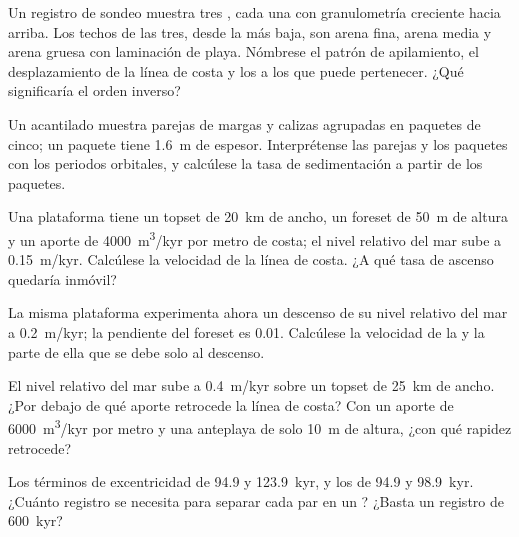 \begin{exercise}[$\star$]\label{exo:b3:sequence-stratigraphy:3}
Un registro de sondeo muestra tres , cada una con granulometría creciente hacia arriba. Los techos de las
tres, desde la más baja, son arena fina, arena media y arena gruesa con
laminación de playa. Nómbrese el patrón de apilamiento, el desplazamiento de la línea de costa y los
 a los que puede pertenecer. ¿Qué significaría el orden inverso?
\end{exercise}

\begin{exercise}[$\star$]\label{exo:b3:sequence-stratigraphy:4}
Un acantilado muestra parejas de margas y calizas agrupadas en paquetes de cinco; un
paquete tiene \qty{1.6}{m} de espesor. Interprétense las parejas y los paquetes con los
periodos orbitales, y calcúlese la tasa de sedimentación a partir de los paquetes.
\end{exercise}

\begin{exercise}[$\star\star$]\label{exo:b3:sequence-stratigraphy:5}
Una plataforma tiene un topset de \qty{20}{km} de ancho, un foreset de \qty{50}{m} de altura y un
aporte de \qty{4000}{m^3/kyr} por metro de costa; el nivel relativo del mar sube
a \qty{0.15}{m/kyr}. Calcúlese la velocidad de la línea de costa.
¿A qué tasa de ascenso quedaría inmóvil?
\end{exercise}

\begin{exercise}[$\star\star$]\label{exo:b3:sequence-stratigraphy:6}
La misma plataforma experimenta ahora un descenso de su nivel relativo del mar a \qty{0.2}{m/kyr}; la
pendiente del foreset es 0.01. Calcúlese la velocidad de la  y la
parte de ella que se debe solo al descenso.
\end{exercise}

\begin{exercise}[$\star\star$]\label{exo:b3:sequence-stratigraphy:7}
El nivel relativo del mar sube a \qty{0.4}{m/kyr} sobre un topset de \qty{25}{km} de ancho.
¿Por debajo de qué aporte retrocede la línea de costa?
Con un aporte de \qty{6000}{m^3/kyr} por metro y una anteplaya de solo \qty{10}{m} de altura,
¿con qué rapidez retrocede?
\end{exercise}

\begin{exercise}[$\star\star$]\label{exo:b3:sequence-stratigraphy:8}
Los términos de excentricidad de 94.9 y \qty{123.9}{kyr}, y los de 94.9 y
\qty{98.9}{kyr}.
¿Cuánto registro se necesita para separar cada par en un ? ¿Basta un registro de \qty{600}{kyr}?
\end{exercise}

